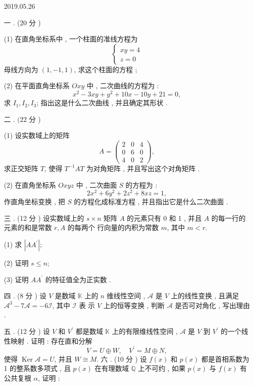 \documentclass[10pt]{article}
\begin{document}
   

2019.05.26

 一 . (20  分 )

(1)  在直角坐标系中 ,  一个柱面的准线方程为 
$$
\left\{\begin{array}{r}
x y=4 \\
z=0
\end{array}\right.
$$
 母线方向为  $(1,-1,1)$,  求这个柱面的方程 ;

(2)  在平面直角坐标系  $O x y$  中 ,  二次曲线的方程为 :
$$
x^{2}-3 x y+y^{2}+10 x-10 y+21=0,
$$
 求  $I_{1}, I_{2}, I_{3}$;  指出这是什么二次曲线 ,  并且确定其形状 .

 二 . $(22$  分 )

(1)  设实数域上的矩阵 
$$
A=\left(\begin{array}{lll}
2 & 0 & 4 \\
0 & 6 & 0 \\
4 & 0 & 2
\end{array}\right),
$$
 求正交矩阵  $T$,  使得  $T^{-1} A T$  为对角矩阵 ,  并且写出这个对角矩阵 .

(2)  在直角坐标系  $O x y z$  中 ,  二次曲面  $S$  的方程为 :
$$
2 x^{2}+6 y^{2}+2 z^{2}+8 x z=1,
$$
 作直角坐标变换 ,  把  $S$  的方程化成标准方程 ,  并且指出它是什么二次曲面 .

 三 . (12  分 )  设实数域上的  $s \times n$  矩阵  $A$  的元素只有  0  和  1 ,  并且  $A$  的每一行的元素的和是常数  $r, A$  的每两个   行向量的内积为常数  $m$,  其中  $m<r$.

(1)  求  $\left|A A^{\prime}\right|$;

(2)  证明  $s \leqslant n$;

(3)  证明  $A A^{\prime}$  的特征值全为正实数 .

 四 . (8  分 )  设  $V$  是数域  $\mathbb{K}$  上的  $n$  维线性空间 , $\mathscr{A}$  是  $V$  上的线性变换 ,  且满足  $\mathscr{A}^{3}-7 \mathscr{A}=-6 \mathscr{I}$,  其中  $\mathscr{I}$  表   示  $V$  上的恒等变换 ,  判断  $\mathscr{A}$  是否可对角化 ,  写出理由 .

 五 . (12  分 )  设  $V$  和  $V^{\prime}$  都是数域  $\mathbb{K}$  上的有限维线性空间 , $\mathscr{A}$  是  $V$  到  $V^{\prime}$  的一个线性映射 .  证明 :  存在直和分解 
$$
V=U \oplus W, \quad V^{\prime}=M \oplus N,
$$
 使得  $\operatorname{Ker} \mathscr{A}=U$,  并且  $W \cong M$.  六 . (10  分 )  设  $f(x)$  和  $p(x)$  都是首相系数为  1  的整系数多项式 ,  且  $p(x)$  在有理数域  $\mathbb{Q}$  上不可约 ,  如果  $p(x)$  与  $f(x)$  有公共复根  $\alpha$,  证明 :
\end{document}
